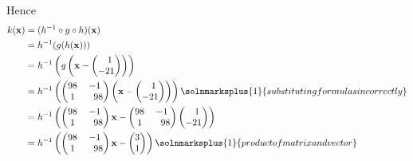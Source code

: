 Hence
\begin{align*}
	k(\mathbf{x}) & =(h^{-1}\circ g \circ h)(\mathbf{x})                                       \\&=h^{-1}(g(h(\mathbf{x})))\\
	              & =h^{-1}\left( g \left(\mathbf{x}-
		                       \begin{pmatrix}
			                       \phantom{-} 1 \\-21
		                       \end{pmatrix}
	                       \right)\right)                                           \\
	              & =h^{-1}\left(
		                       \begin{pmatrix}
			                       98 & -1 \\1&\phantom{-} 98
		                       \end{pmatrix}
		                       \left(\mathbf{x}-
		                       \begin{pmatrix}
			                       \phantom{-} 1 \\-21
		                       \end{pmatrix}
	                       \right)\right)\solnmarksplus{1}{substituting formulas in correctly} \\
	              & =h^{-1}\left(
		                       \begin{pmatrix}
			                       98 & -1 \\1&\phantom{-} 98
		                       \end{pmatrix}
		                       \mathbf{x}-
		                       \begin{pmatrix}
			                       98 & -1 \\1& \phantom{-} 98
		                       \end{pmatrix}
		                       \begin{pmatrix}
			                       \phantom{-} 1 \\-21
		                       \end{pmatrix}
	                       \right)                                        \\
	              & =h^{-1}\left(
		                       \begin{pmatrix}
			                       98 & -1 \\1& \phantom{-} 98
		                       \end{pmatrix}
		                       \mathbf{x}-
		                       \begin{pmatrix}
			                       3 \\1
		                       \end{pmatrix}
	                       \right)\solnmarksplus{1}{product of matrix and vector}              \\
\end{align*}
